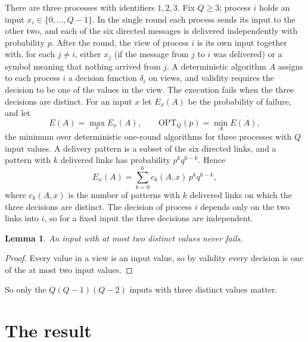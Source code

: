 \documentclass[11pt]{article}
\newtheorem{lemma}[theorem]{Lemma}
\theoremstyle{remark}
\newcommand{\OPT}{\mathrm{OPT}}
\begin{document}
There are three processes with identifiers $1,2,3$. Fix $Q\ge3$; process $i$ holds an input $x_i\in\{0,\dots,Q-1\}$. In the single round each process sends its input to the other two, and each of the six directed messages is delivered independently with probability $p$. After the round, the view of process $i$ is its own input together with, for each $j\neq i$, either $x_j$ (if the message from $j$ to $i$ was delivered) or a symbol meaning that nothing arrived from $j$. A deterministic algorithm $A$ assigns to each process $i$ a decision function $\delta_i$ on views, and validity requires the decision to be one of the values in the view. The execution fails when the three decisions are distinct. For an input $x$ let $E_x(A)$ be the probability of failure, and let
\[
E(A)=\max_x E_x(A),\qquad \OPT_{Q}(p)=\min_A E(A),
\]
the minimum over deterministic one-round algorithms for three processes with $Q$ input values. A delivery pattern is a subset of the six directed links, and a pattern with $k$ delivered links has probability $p^kq^{6-k}$. Hence
\begin{equation}\label{eq:counts}
E_x(A)=\sum_{k=0}^{6} c_k(A,x)\,p^kq^{6-k},
\end{equation}
where $c_k(A,x)$ is the number of patterns with $k$ delivered links on which the three decisions are distinct. The decision of process $i$ depends only on the two links into $i$, so for a fixed input the three decisions are independent.

\begin{lemma}\label{lem:twovalues}
An input with at most two distinct values never fails.
\end{lemma}

\begin{proof}
Every value in a view is an input value, so by validity every decision is one of the at most two input values.
\end{proof}

So only the $Q(Q-1)(Q-2)$ inputs with three distinct values matter.

\section{The result}\label{sec:result}
\end{document}

